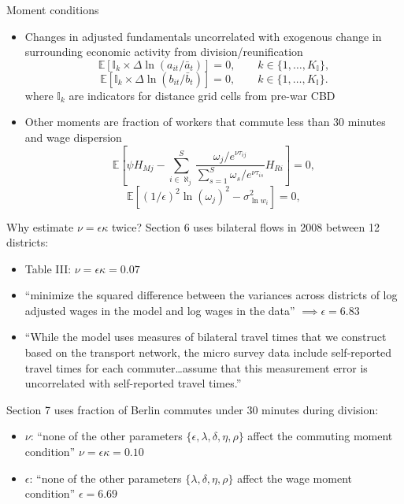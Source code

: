 \documentclass[11pt,notes=hide,aspectratio=169]{beamer}
\begin{document}
\begin{frame}{Moment conditions}
\begin{itemize}
\item Changes in adjusted fundamentals uncorrelated with exogenous change in surrounding economic activity from division/reunification
\begin{equation*}
\mathbb{E} \left[ \mathbb{I}_{k} \times \Delta \ln \left( a_{it} / \bar{a}_{t} \right) \right] = 0, \qquad k \in \{1, \dots, K_{\mathbb{I}}\},
\end{equation*}
\begin{equation*}
\mathbb{E} \left[ \mathbb{I}_{k} \times \Delta \ln \left( b_{it} / \bar{b}_{t} \right) \right] = 0, \qquad k \in \{1, \dots, K_{\mathbb{I}}\}.
\end{equation*}
where $ \mathbb{I}_{k}$ are indicators for distance grid cells from pre-war CBD
\item Other moments are fraction of workers that commute less than 30 minutes and wage dispersion
\begin{equation*}
\mathbb{E} \left[ \psi H_{Mj} - \sum_{i \in \aleph_{j}}^{S} \frac{ \omega_{j} / e^{\nu \tau_{ij}} }
{\sum_{s=1}^{S} \omega_{s} / e^{\nu \tau_{is}} } H_{Ri} \right] = 0,
\end{equation*}
\begin{equation*}
\mathbb{E} \left[ \left( 1/\epsilon \right)^{2} \ln \left( \omega_{j} \right)^{2} - \sigma_{\ln w_{i}}^{2} \right] = 0,
\end{equation*}
\end{itemize}
\end{frame}
\begin{frame}{Why estimate $\nu = \epsilon \kappa$ twice?}
Section 6 uses bilateral flows in 2008 between 12 districts:
\begin{itemize}
\item Table III: $\nu = \epsilon \kappa = 0.07$
\item ``minimize the squared difference between the variances across districts of log adjusted wages in the model and log wages in the data'' $\implies \epsilon = 6.83$
\item ``While the model uses measures of bilateral travel times that we construct based on the transport network, the micro survey data include self-reported travel times for each commuter\dots assume that this measurement error is uncorrelated with self-reported travel times.''
\end{itemize}
Section 7 uses fraction of Berlin commutes under 30 minutes during division:
\begin{itemize}
\item $\nu$: ``none of the other parameters $\{\epsilon,\lambda,\delta,\eta,\rho\}$ affect the commuting moment condition'' $\nu = \epsilon \kappa = 0.10$ 
\item $\epsilon$: ``none of the other parameters $\{\lambda,\delta,\eta,\rho\}$ affect the wage moment condition'' $\epsilon = 6.69$
\end{itemize}
\end{frame}
\end{document}
